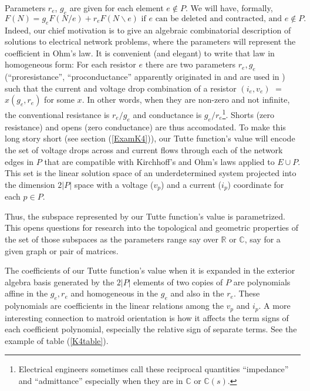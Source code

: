 \documentclass[Unicode]{cedram-alco}
\begin{document}
Parameters $r_e$, $g_e$ are given for each element $e\not\in P$. We
will have, formally,
\begin{equation}\label{ParamTutteEqGeneric}
   F(N) = g_eF(N/e)+r_eF(N\backslash e) \text{ if\ }e\text{ can be deleted and contracted, and }e\not\in P.
\end{equation}
Indeed, our chief motivation is to give an algebraic combinatorial description of solutions
to electrical network problems, where the parameters will represent the coefficient
in Ohm's law.  It is convenient (and elegant) to write that law in homogeneous form:
For each resistor $e$ there
are two parameters $r_e,g_e$
(``proresistance'', ``proconductance'' apparently originated in \cite{SmithElec} and are used in
\cite{TutteEx,CirThProjHomo2019}) such that the current and voltage drop
combination of a resistor $(i_e,v_e)$ $=$ $x(g_e,r_e)$ for some $x$.
In other words, when they
are non-zero and not infinite, the conventional
resistance is $r_e/g_e$ and conductance is $g_e/r_e$\footnote{Electrical engineers
sometimes call these reciprocal quantities ``impedance'' and ``admittance'' especially
when they are in $\mathbb{C}$ or $\mathbb{C}(s)$.}. Shorts (zero resistance) and opens (zero
conductance) are thus accomodated.   To make this long story short (see section (\ref{ExamK4})),
our Tutte function's value
will encode the set of voltage drops across and current flows through each of
the network edges in $P$ that are compatible with Kirchhoff's and Ohm's laws applied to $E\cup P$. This set
is the linear solution space of an underdetermined system projected into the
dimension $2|P|$ space with a voltage ($v_{p}$) and a current ($i_{p}$) coordinate for each $p\in P$.

Thus, the subspace represented by our Tutte function's value is parametrized.
This opens questions for research into the topological and geometric properties
of the set of those subspaces
as the parameters range say over
$\mathbb{R}$ or $\mathbb{C}$, say for a given graph or pair of
matrices.

The coefficients of our Tutte function's value when it is expanded
in the exterior algebra basis
generated by the $2|P|$ elements of two copies of $P$
are polynomials affine in the $g_e, r_e$
and homogeneous in the $g_e$ and also in the $r_e$.
These polynomials are coefficients in the
linear relations among the $v_p$ and $i_p$.
A more interesting connection to matroid orientation is how it
affects the term signs of each coefficient polynomial,
especially the relative sign of separate terms.
See the example of table (\ref{K4table}).
\end{document}
